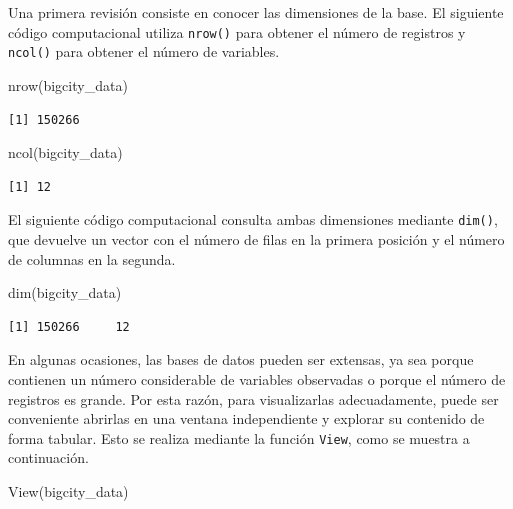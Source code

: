\documentclass[
  spanish,
  11pt,
  letterpaper,
  oneside,
  open=any]{scrbook}
\newenvironment{Shaded}{\begin{snugshade}}{\end{snugshade}}
\newcommand{\FunctionTok}[1]{\textcolor[rgb]{0.28,0.35,0.67}{#1}}
\newcommand{\NormalTok}[1]{\textcolor[rgb]{0.00,0.23,0.31}{#1}}
\begin{document}
Una primera revisión consiste en conocer las dimensiones de la base. El
siguiente código computacional utiliza \texttt{nrow()} para obtener el
número de registros y \texttt{ncol()} para obtener el número de
variables.

\begin{Shaded}
\begin{Highlighting}[]
\FunctionTok{nrow}\NormalTok{(bigcity\_data)}
\end{Highlighting}
\end{Shaded}

\begin{verbatim}
[1] 150266
\end{verbatim}

\begin{Shaded}
\begin{Highlighting}[]
\FunctionTok{ncol}\NormalTok{(bigcity\_data)}
\end{Highlighting}
\end{Shaded}

\begin{verbatim}
[1] 12
\end{verbatim}

El siguiente código computacional consulta ambas dimensiones mediante
\texttt{dim()}, que devuelve un vector con el número de filas en la
primera posición y el número de columnas en la segunda.

\begin{Shaded}
\begin{Highlighting}[]
\FunctionTok{dim}\NormalTok{(bigcity\_data)}
\end{Highlighting}
\end{Shaded}

\begin{verbatim}
[1] 150266     12
\end{verbatim}

En algunas ocasiones, las bases de datos pueden ser extensas, ya sea
porque contienen un número considerable de variables observadas o porque
el número de registros es grande. Por esta razón, para visualizarlas
adecuadamente, puede ser conveniente abrirlas en una ventana
independiente y explorar su contenido de forma tabular. Esto se realiza
mediante la función \texttt{View}, como se muestra a continuación.

\begin{Shaded}
\begin{Highlighting}[]
\FunctionTok{View}\NormalTok{(bigcity\_data)}
\end{Highlighting}
\end{Shaded}
\end{document}
